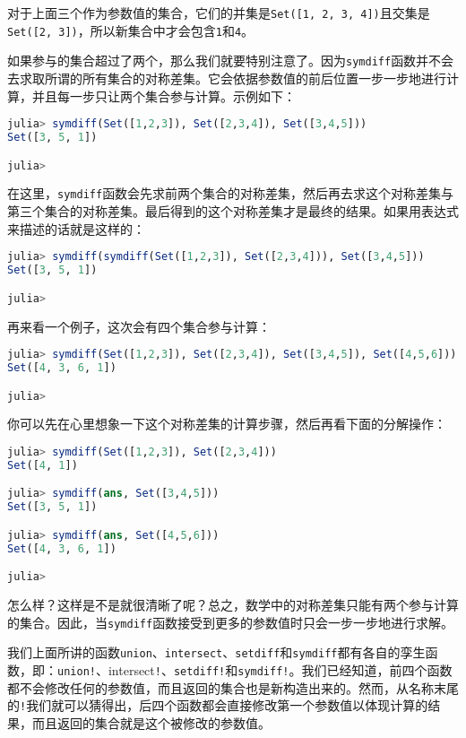对于上面三个作为参数值的集合，它们的并集是\verb`Set([1, 2, 3, 4])`且交集是\verb`Set([2, 3])`，所以新集合中才会包含\verb`1`和\verb`4`。

如果参与的集合超过了两个，那么我们就要特别注意了。因为\verb`symdiff`函数并不会去求取所谓的所有集合的对称差集。它会依据参数值的前后位置一步一步地进行计算，并且每一步只让两个集合参与计算。示例如下：

\begin{lstlisting}[language=julia]
julia> symdiff(Set([1,2,3]), Set([2,3,4]), Set([3,4,5]))
Set([3, 5, 1])

julia> 
\end{lstlisting}

在这里，\verb`symdiff`函数会先求前两个集合的对称差集，然后再去求这个对称差集与第三个集合的对称差集。最后得到的这个对称差集才是最终的结果。如果用表达式来描述的话就是这样的：

\begin{lstlisting}[language=julia]
julia> symdiff(symdiff(Set([1,2,3]), Set([2,3,4])), Set([3,4,5]))
Set([3, 5, 1])

julia> 
\end{lstlisting}

再来看一个例子，这次会有四个集合参与计算：

\begin{lstlisting}[language=julia]
julia> symdiff(Set([1,2,3]), Set([2,3,4]), Set([3,4,5]), Set([4,5,6]))
Set([4, 3, 6, 1])

julia> 
\end{lstlisting}

你可以先在心里想象一下这个对称差集的计算步骤，然后再看下面的分解操作：

\begin{lstlisting}[language=julia]
julia> symdiff(Set([1,2,3]), Set([2,3,4]))
Set([4, 1])

julia> symdiff(ans, Set([3,4,5]))
Set([3, 5, 1])

julia> symdiff(ans, Set([4,5,6]))
Set([4, 3, 6, 1])

julia> 
\end{lstlisting}

怎么样？这样是不是就很清晰了呢？总之，数学中的对称差集只能有两个参与计算的集合。因此，当\verb`symdiff`函数接受到更多的参数值时只会一步一步地进行求解。

我们上面所讲的函数\verb`union`、\verb`intersect`、\verb`setdiff`和\verb`symdiff`都有各自的孪生函数，即：\verb`union!`、intersect\verb`!`、\verb`setdiff!`和\verb`symdiff!`。我们已经知道，前四个函数都不会修改任何的参数值，而且返回的集合也是新构造出来的。然而，从名称末尾的\verb`!`我们就可以猜得出，后四个函数都会直接修改第一个参数值以体现计算的结果，而且返回的集合就是这个被修改的参数值。

